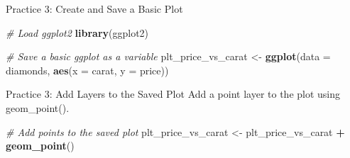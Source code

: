 \documentclass[
  ignorenonframetext,
]{beamer}
\newenvironment{Shaded}{\begin{snugshade}}{\end{snugshade}}
\newcommand{\AttributeTok}[1]{\textcolor[rgb]{0.13,0.29,0.53}{#1}}
\newcommand{\CommentTok}[1]{\textcolor[rgb]{0.56,0.35,0.01}{\textit{#1}}}
\newcommand{\FunctionTok}[1]{\textcolor[rgb]{0.13,0.29,0.53}{\textbf{#1}}}
\newcommand{\NormalTok}[1]{#1}
\newcommand{\OtherTok}[1]{\textcolor[rgb]{0.56,0.35,0.01}{#1}}
\newcommand{\SpecialCharTok}[1]{\textcolor[rgb]{0.81,0.36,0.00}{\textbf{#1}}}
\begin{document}
\begin{frame}[fragile]{Practice 3: Create and Save a Basic Plot}
\label{practice-3-create-and-save-a-basic-plot-1}

\begin{Shaded}
\begin{Highlighting}[]
\CommentTok{\# Load ggplot2}
\FunctionTok{library}\NormalTok{(ggplot2)}

\CommentTok{\# Save a basic ggplot as a variable}
\NormalTok{plt\_price\_vs\_carat }\OtherTok{\textless{}{-}} \FunctionTok{ggplot}\NormalTok{(}\AttributeTok{data =}\NormalTok{ diamonds, }\FunctionTok{aes}\NormalTok{(}\AttributeTok{x =}\NormalTok{ carat,}
    \AttributeTok{y =}\NormalTok{ price))}
\end{Highlighting}
\end{Shaded}
\end{frame}

\begin{frame}[fragile]{Practice 3: Add Layers to the Saved Plot}
\label{practice-3-add-layers-to-the-saved-plot}
Add a point layer to the plot using geom\_point().


\begin{Shaded}
\begin{Highlighting}[]
\CommentTok{\# Add points to the saved plot}
\NormalTok{plt\_price\_vs\_carat }\OtherTok{\textless{}{-}}\NormalTok{ plt\_price\_vs\_carat }\SpecialCharTok{+} \FunctionTok{geom\_point}\NormalTok{()}
\end{Highlighting}
\end{Shaded}
\end{frame}
\end{document}
